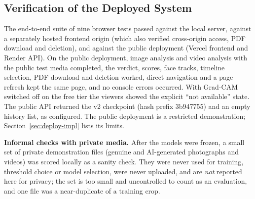 \subsection{Verification of the Deployed System}
The end-to-end suite of nine browser tests passed against the local server, against a separately hosted frontend origin (which also verified cross-origin
access, PDF download and deletion), and against the public deployment (Vercel frontend and Render API). On the public deployment, image analysis and video analysis with the public test media
completed, the verdict, scores, face tracks, timeline selection, PDF download and deletion worked, direct navigation and a page refresh kept the same page, and no console errors
occurred. With Grad-CAM switched off on the free tier the viewers showed the explicit ``not available'' state. The public API returned the v2 checkpoint
(hash prefix 3b947755) and an empty history list, as configured. The public deployment is a restricted demonstration; Section~\ref{sec:deploy-impl} lists its limits.

\textbf{Informal checks with private media.} After the models were frozen, a small set of private demonstration files (genuine and AI-generated photographs and videos) was scored locally as a sanity check.
They were never used for training, threshold choice or model selection, were never uploaded, and are \emph{not} reported here for privacy; the set is too small and uncontrolled to count as an evaluation, and one file was a near-duplicate
of a training crop.

